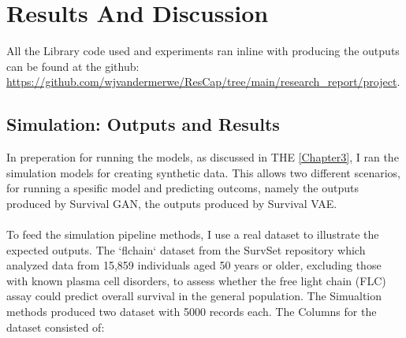 \chapter{Results And Discussion}
\label{Chapter4}
All the Library code used and experiments ran inline with producing the outputs can be found at the github: \url{https://github.com/wjvandermerwe/ResCap/tree/main/research_report/project}.

\section{Simulation: Outputs and Results}
In preperation for running the models, as discussed in THE \ref{Chapter3}, I ran the simulation models for creating synthetic data. This allows two different scenarios, for running a spesific model and predicting outcoms, namely the outputs produced by Survival GAN, the outputs produced by Survival VAE.
\\\\
\noindent To feed the simulation pipeline methods, I use a real dataset to illustrate the expected outputs. The `flchain` dataset \parencite{dispenzieri_use_2012} from the SurvSet repository \parencite{drysdale_survset_2022} which analyzed data from 15,859 individuals aged 50 years or older, excluding those with known plasma cell disorders, to assess whether the free light chain (FLC) assay could predict overall survival in the general population. The Simualtion methods produced two dataset with 5000 records each. The Columns for the dataset consisted of:
 
